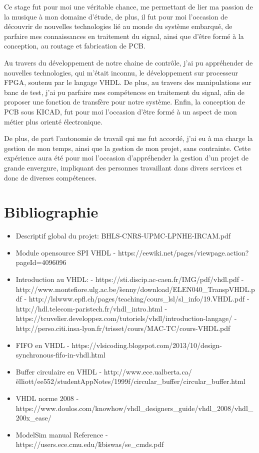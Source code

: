 \documentclass[french,a4paper,12pt]{report}
\begin{document}
Ce stage fut pour moi une véritable chance, me permettant de lier ma passion de la musique à mon domaine d'étude, de plus, il fut pour moi l'occasion de découvrir de nouvelles technologies lié au monde du système embarqué, de parfaire mes connaissances en traitement du signal, ainsi que d'être formé à la conception, au routage et fabrication de PCB.

Au travers du développement de notre chaine de contrôle, j'ai pu appréhender de nouvelles technologies, qui m'était inconnu, le développement sur processeur FPGA, soutenu par le langage VHDL. De plus, au travers des manipulations sur banc de test, j'ai pu parfaire mes compétences en traitement du signal, afin de proposer une fonction de transfère pour notre système. Enfin, la conception de PCB sous KICAD, fut pour moi l'occasion d'être formé à un aspect de mon métier plus orienté électronique.

De plus, de part l'autonomie de travail qui me fut accordé, j'ai eu à ma charge la gestion de mon temps, ainsi que la gestion de mon projet, sans contrainte. Cette expérience aura été pour moi l'occasion d'appréhender la gestion d'un projet de grande envergure, impliquant des personnes travaillant dans divers services et donc de diverses compétences.


\part{Bibliographie}

	\begin{itemize}
		\item Descriptif global du projet: BHLS-CNRS-UPMC-LPNHE-IRCAM.pdf
		\item Module opensource SPI VHDL - https://eewiki.net/pages/viewpage.action?pageId=4096096
		\item Introduction au VHDL:
						- https://sti.discip.ac-caen.fr/IMG/pdf/vhdl.pdf
						- http://www.montefiore.ulg.ac.be/\~senny/download/ELEN040\_TranspVHDL.pdf
						- http://lslwww.epfl.ch/pages/teaching/cours\_lsl/sl\_info/19.VHDL.pdf
						- http://hdl.telecom-paristech.fr/vhdl\_intro.html
						- https://tcuvelier.developpez.com/tutoriels/vhdl/introduction-langage/
						- http://perso.citi.insa-lyon.fr/trisset/cours/MAC-TC/cours-VHDL.pdf
		\item FIFO en VHDL - https://vlsicoding.blogspot.com/2013/10/design-synchronous-fifo-in-vhdl.html
		\item Buffer circulaire en VHDL - http://www.ece.ualberta.ca/\~elliott/ee552/studentAppNotes/1999f/circular\_buffer/circular\_buffer.html
		\item VHDL norme 2008 - https://www.doulos.com/knowhow/vhdl\_designers\_guide/vhdl\_2008/vhdl\_200x\_ease/
		\item ModelSim manual Reference - https://users.ece.cmu.edu/\~kbiswas/se\_cmds.pdf
	\end{itemize}
\end{document}
